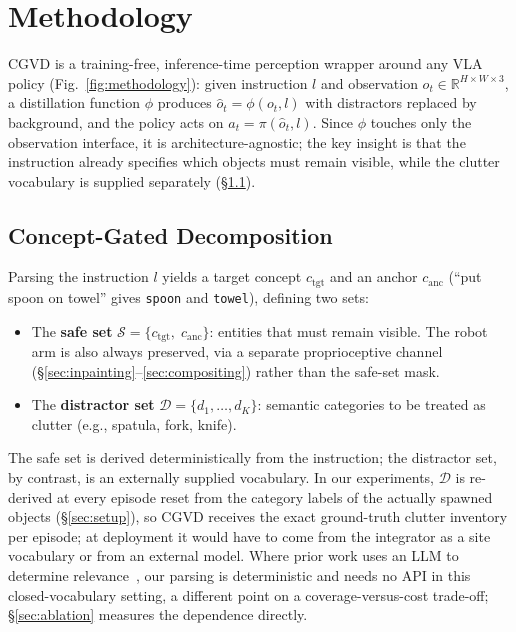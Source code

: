 \documentclass[letterpaper, 10 pt, conference]{ieeeconf}  %
\begin{document}
\section{Methodology}
\label{sec:methodology}
CGVD is a training-free, inference-time perception wrapper around any VLA policy (Fig.~\ref{fig:methodology}): given instruction $l$ and observation $o_t \in \mathbb{R}^{H \times W \times 3}$, a distillation function $\phi$ produces $\hat{o}_t = \phi(o_t, l)$ with distractors replaced by background, and the policy acts on $a_t = \pi(\hat{o}_t, l)$. Since $\phi$ touches only the observation interface, it is architecture-agnostic; the key insight is that the instruction already specifies which objects must remain visible, while the clutter vocabulary is supplied separately (\S\ref{sec:decomposition}).

\subsection{Concept-Gated Decomposition}
\label{sec:decomposition}

Parsing the instruction $l$ yields a target concept $c_{\text{tgt}}$ and an anchor $c_{\text{anc}}$ (``put spoon on towel'' gives \texttt{spoon} and \texttt{towel}), defining two sets:
\begin{itemize}
    \item The \textbf{safe set} $\mathcal{S} = \{c_{\text{tgt}},\; c_{\text{anc}}\}$: entities that must remain visible. The robot arm is also always preserved, via a separate proprioceptive channel (\S\ref{sec:inpainting}--\ref{sec:compositing}) rather than the safe-set mask.
    \item The \textbf{distractor set} $\mathcal{D} = \{d_1, \ldots, d_K\}$: semantic categories to be treated as clutter (e.g., spatula, fork, knife).
\end{itemize}

The safe set is derived deterministically from the instruction; the distractor set, by contrast, is an externally supplied vocabulary. In our experiments, $\mathcal{D}$ is re-derived at every episode reset from the category labels of the actually spawned objects (\S\ref{sec:setup}), so CGVD receives the exact ground-truth clutter inventory per episode; at deployment it would have to come from the integrator as a site vocabulary or from an external model. Where prior work uses an LLM to determine relevance~\cite{byovla}, our parsing is deterministic and needs no API in this closed-vocabulary setting, a different point on a coverage-versus-cost trade-off; \S\ref{sec:ablation} measures the dependence directly.
\end{document}
